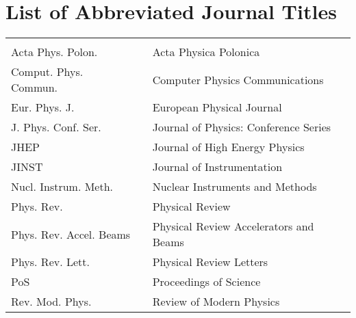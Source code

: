 
\chapter*{List of Abbreviated Journal Titles}
\begin{center}
  \begin{tabular}{lll}
    \hspace*{2em} & \hspace*{1in} & \hspace*{4.5in} \\
    Acta Phys. Polon. & \dotfill & Acta Physica Polonica \\
    Comput. Phys. Commun. & \dotfill & Computer Physics Communications \\
    Eur. Phys. J. & \dotfill & European Physical Journal \\
    J. Phys. Conf. Ser. & \dotfill & Journal of Physics: Conference Series \\
    JHEP & \dotfill & Journal of High Energy Physics \\
    JINST & \dotfill & Journal of Instrumentation \\
    Nucl. Instrum. Meth. & \dotfill & Nuclear Instruments and Methods \\
    Phys. Rev. & \dotfill & Physical Review \\
    Phys. Rev. Accel. Beams & \dotfill & Physical Review Accelerators and Beams \\
    Phys. Rev. Lett. & \dotfill & Physical Review Letters \\
    PoS & \dotfill & Proceedings of Science \\
    Rev. Mod. Phys. & \dotfill & Review of Modern Physics \\
  \end{tabular}
\end{center}
\cleardoublepage
